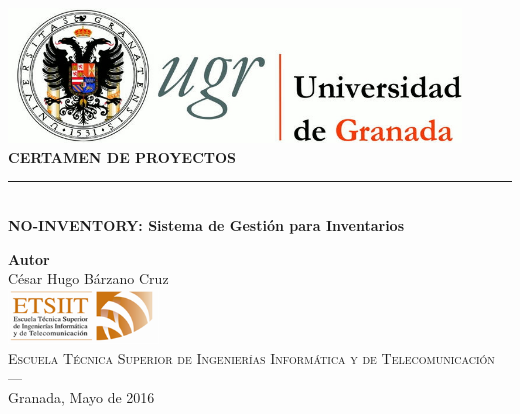 \begin{titlepage}
 
 
\newlength{\centeroffset}
\setlength{\centeroffset}{-0.5\oddsidemargin}
\addtolength{\centeroffset}{0.5\evensidemargin}
\thispagestyle{empty}

\noindent\hspace*{\centeroffset}\begin{minipage}{\textwidth}

\centering
\includegraphics[width=0.9\textwidth]{imagenes/logo_ugr.jpg}\\[1.4cm]

% 
{\Huge\bfseries CERTAMEN DE PROYECTOS\\
}
\noindent\rule[-1ex]{\textwidth}{3pt}\\[3.5ex]
{\large\bfseries NO-INVENTORY: Sistema de Gestión para Inventarios}
\end{minipage}

\vspace{2.5cm}
\noindent\hspace*{\centeroffset}\begin{minipage}{\textwidth}
\centering

\textbf{Autor}\\ {César Hugo Bárzano Cruz}\\[2.5ex]

\includegraphics[width=0.3\textwidth]{imagenes/etsiit_logo.png}\\[0.1cm]
\textsc{Escuela Técnica Superior de Ingenierías Informática y de Telecomunicación}\\
\textsc{---}\\
Granada, Mayo de 2016
\end{minipage}
\end{titlepage}


